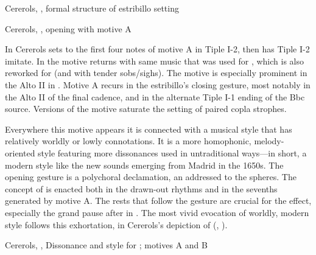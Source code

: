 {Cererols, , formal structure of estribillo setting}

{Cererols, , opening with motive A}

In  Cererols sets  to the
first four notes of motive A in Tiple I-2, then has Tiple I-2 imitate.
In  the motive returns with same music that was used for
, which is also reworked for  (and with tender sobs/sighs).
The motive is especially prominent in the Alto II in .
Motive A recurs in the estribillo's closing gesture, most notably in the Alto II
of the final cadence, and in the alternate Tiple I-1 ending of the Bbc source.
Versions of the motive saturate the setting of paired copla strophes.

Everywhere this motive appears it is connected with a musical style that has
relatively worldly or lowly connotations.
It is a more homophonic, melody-oriented style featuring more dissonances used
in untraditional ways---in short, a modern style like the new sounds
emerging from Madrid in the 1650s.
The opening gesture is a polychoral declamation, an  addressed to
the spheres.
The concept of  is enacted both in the drawn-out rhythms and
in the sevenths generated by motive A.
The rests that follow the gesture are crucial for the effect, especially the
grand pause after  in .
The most vivid evocation of worldly, modern style follows this exhortation, in
Cererols's depiction of  (,
).

{Cererols, , Dissonance and  style for
; motives A and B} 

